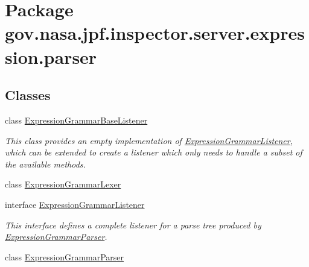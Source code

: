 \hypertarget{namespacegov_1_1nasa_1_1jpf_1_1inspector_1_1server_1_1expression_1_1parser}{}\section{Package gov.\+nasa.\+jpf.\+inspector.\+server.\+expression.\+parser}
\label{namespacegov_1_1nasa_1_1jpf_1_1inspector_1_1server_1_1expression_1_1parser}
\subsection*{Classes}
\begin{DoxyCompactItemize}
\item 
class \hyperlink{classgov_1_1nasa_1_1jpf_1_1inspector_1_1server_1_1expression_1_1parser_1_1_expression_grammar_base_listener}{Expression\+Grammar\+Base\+Listener}
\begin{DoxyCompactList}\small\item\em This class provides an empty implementation of \hyperlink{interfacegov_1_1nasa_1_1jpf_1_1inspector_1_1server_1_1expression_1_1parser_1_1_expression_grammar_listener}{Expression\+Grammar\+Listener}, which can be extended to create a listener which only needs to handle a subset of the available methods. \end{DoxyCompactList}\item 
class \hyperlink{classgov_1_1nasa_1_1jpf_1_1inspector_1_1server_1_1expression_1_1parser_1_1_expression_grammar_lexer}{Expression\+Grammar\+Lexer}
\item 
interface \hyperlink{interfacegov_1_1nasa_1_1jpf_1_1inspector_1_1server_1_1expression_1_1parser_1_1_expression_grammar_listener}{Expression\+Grammar\+Listener}
\begin{DoxyCompactList}\small\item\em This interface defines a complete listener for a parse tree produced by \hyperlink{classgov_1_1nasa_1_1jpf_1_1inspector_1_1server_1_1expression_1_1parser_1_1_expression_grammar_parser}{Expression\+Grammar\+Parser}. \end{DoxyCompactList}\item 
class \hyperlink{classgov_1_1nasa_1_1jpf_1_1inspector_1_1server_1_1expression_1_1parser_1_1_expression_grammar_parser}{Expression\+Grammar\+Parser}
\end{DoxyCompactItemize}
